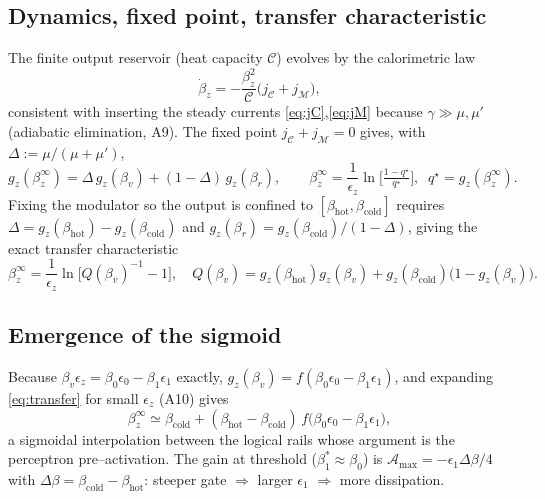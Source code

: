 \documentclass[11pt,a4paper]{article}
\theoremstyle{plain}
\theoremstyle{definition}
\theoremstyle{remark}
\newcommand{\calC}{\mathcal{C}}
\newcommand{\calM}{\mathcal{M}}
\newcommand{\calA}{\mathcal{A}}
\newcommand{\gz}{g_z}
\begin{document}
\subsection{Dynamics, fixed point, transfer characteristic}
\label{sec:dynamics}
The finite output reservoir (heat capacity $\calC$) evolves by the
calorimetric law
\begin{equation}
\dot\beta_z=-\frac{\beta_z^2}{\calC}\big(j_{\calC}+j_\calM\big),
\label{eq:calorimetric}
\end{equation}
consistent with inserting the steady currents \eqref{eq:jC},\eqref{eq:jM}
because $\gamma\gg\mu,\mu'$ (adiabatic elimination, A9). The fixed point
$j_{\calC}+j_\calM=0$ gives, with $\Delta:=\mu/(\mu+\mu')$,
\begin{equation}
\gz(\beta_z^\infty)=\Delta\,\gz(\beta_v)+(1-\Delta)\,\gz(\beta_r),
\qquad
\beta_z^\infty=\frac{1}{\epsilon_z}\ln\!\Big[\tfrac{1-q^\star}{q^\star}\Big],
\;\; q^\star=\gz(\beta_z^\infty).
\label{eq:fixedpoint}
\end{equation}
Fixing the modulator so the output is confined to
$[\beta_{\mathrm{hot}},\beta_{\mathrm{cold}}]$ requires
$\Delta=\gz(\beta_{\mathrm{hot}})-\gz(\beta_{\mathrm{cold}})$ and
$\gz(\beta_r)=\gz(\beta_{\mathrm{cold}})/(1-\Delta)$, giving the exact
transfer characteristic
\begin{equation}
\beta_z^\infty=\frac{1}{\epsilon_z}\ln\!\big[Q(\beta_v)^{-1}-1\big],
\quad
Q(\beta_v)=\gz(\beta_{\mathrm{hot}})\gz(\beta_v)
+\gz(\beta_{\mathrm{cold}})\big(1-\gz(\beta_v)\big).
\label{eq:transfer}
\end{equation}

\subsection{Emergence of the sigmoid}
Because $\beta_v\epsilon_z=\beta_0\epsilon_0-\beta_1\epsilon_1$ exactly,
$\gz(\beta_v)=f(\beta_0\epsilon_0-\beta_1\epsilon_1)$, and expanding
\eqref{eq:transfer} for small $\epsilon_z$ (A10) gives
\begin{equation}
\beta_z^\infty\simeq\beta_{\mathrm{cold}}
+(\beta_{\mathrm{hot}}-\beta_{\mathrm{cold}})\,
f\big(\beta_0\epsilon_0-\beta_1\epsilon_1\big),
\label{eq:sigmoid}
\end{equation}
a sigmoidal interpolation between the logical rails whose argument is the
perceptron pre--activation. The gain at threshold ($\beta_1^\ast\approx
\beta_0$) is $\calA_{\max}=-\epsilon_1\Delta\beta/4$ with
$\Delta\beta=\beta_{\mathrm{cold}}-\beta_{\mathrm{hot}}$: steeper gate
$\Rightarrow$ larger $\epsilon_1$ $\Rightarrow$ more dissipation.
\end{document}
